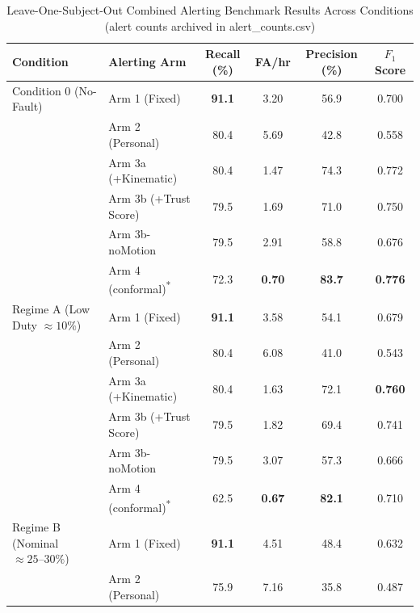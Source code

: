\begin{table}[t]
\caption{Leave-One-Subject-Out Combined Alerting Benchmark Results Across Conditions (alert counts archived in alert\_counts.csv)}
\label{tab:combined_metrics}
\centering
\scriptsize
\renewcommand{\arraystretch}{0.80}
\setlength{\tabcolsep}{5.0pt}
\begin{tabular}{|l|l|c|c|c|c|}
\hline
\textbf{Condition} & \textbf{Alerting Arm} & \textbf{Recall (\%)} & \textbf{FA/hr} & \textbf{Precision (\%)} & \textbf{$F_1$ Score} \\
\hline
Condition 0 (No-Fault)       & Arm 1 (Fixed)                        & \textbf{91.1} &  3.20 &  56.9 & 0.700 \\
                             & Arm 2 (Personal)                     &  80.4 &  5.69 &  42.8 & 0.558 \\
                             & Arm 3a (+Kinematic)                  &  80.4 &  1.47 &  74.3 & 0.772 \\
                             & Arm 3b (+Trust Score)                &  79.5 &  1.69 &  71.0 & 0.750 \\
                             & Arm 3b-noMotion                      &  79.5 &  2.91 &  58.8 & 0.676 \\
                             & Arm 4 (conformal)\textsuperscript{*} &  72.3 & \textbf{0.70} & \textbf{83.7} & \textbf{0.776} \\
\hline
Regime A (Low Duty $\approx 10\%$) & Arm 1 (Fixed)                        & \textbf{91.1} &  3.58 &  54.1 & 0.679 \\
                             & Arm 2 (Personal)                     &  80.4 &  6.08 &  41.0 & 0.543 \\
                             & Arm 3a (+Kinematic)                  &  80.4 &  1.63 &  72.1 & \textbf{0.760} \\
                             & Arm 3b (+Trust Score)                &  79.5 &  1.82 &  69.4 & 0.741 \\
                             & Arm 3b-noMotion                      &  79.5 &  3.07 &  57.3 & 0.666 \\
                             & Arm 4 (conformal)\textsuperscript{*} &  62.5 & \textbf{0.67} & \textbf{82.1} & 0.710 \\
\hline
Regime B (Nominal $\approx 25\text{--}30\%$) & Arm 1 (Fixed)                        & \textbf{91.1} &  4.51 &  48.4 & 0.632 \\
                             & Arm 2 (Personal)                     &  75.9 &  7.16 &  35.8 & 0.487 \\

\end{tabular}
\end{table}
